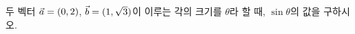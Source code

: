 두 벡터 $\vec{a}=(0{,}\mkern3mu\mathopen{}2)$, $\vec{b}=(1{,}\mkern3mu\mathopen{}\sqrt{3})$이 이루는 각의 크기를 $\theta$라 할 때, $\sin\theta$의 값을 구하시오.
